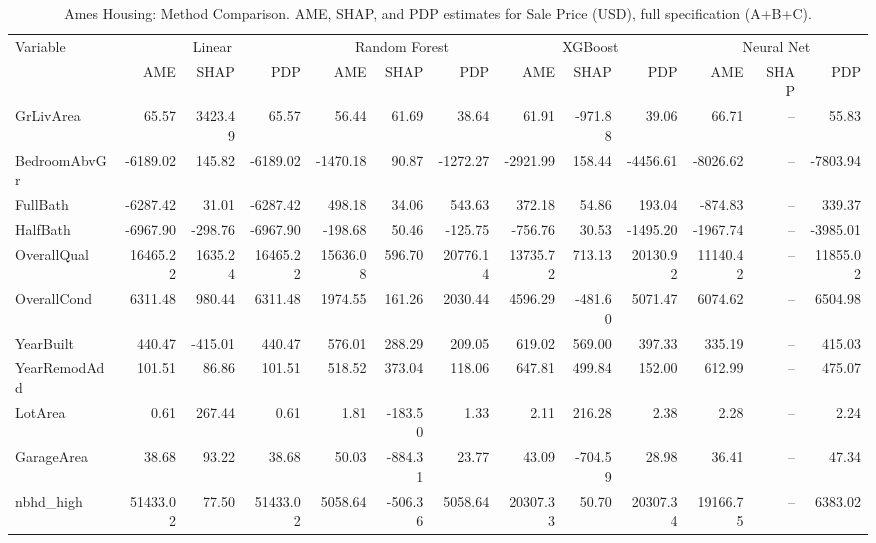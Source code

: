 \documentclass[12pt]{article}
\begin{document}
	\begin{table}
		\centering
		\small
		\begin{threeparttable}
			\caption{Ames Housing: Method Comparison. AME, SHAP, and PDP estimates for Sale Price (USD), full specification (A+B+C).}
			\label{tab:ames_housing_method_comparison}
			\begin{tabular}{lrrrrrrrrrrrr}
				\toprule
				Variable & \multicolumn{3}{c}{Linear} & \multicolumn{3}{c}{Random Forest} & \multicolumn{3}{c}{XGBoost} & \multicolumn{3}{c}{Neural Net} \\
				\cmidrule(lr){2-4} \cmidrule(lr){5-7} \cmidrule(lr){8-10} \cmidrule(lr){11-13} 
				& AME & SHAP & PDP & AME & SHAP & PDP & AME & SHAP & PDP & AME & SHAP & PDP \\
				\midrule
				GrLivArea & 65.57 & 3423.49 & 65.57 & 56.44 & 61.69 & 38.64 & 61.91 & -971.88 & 39.06 & 66.71 & -- & 55.83 \\
				BedroomAbvGr & -6189.02 & 145.82 & -6189.02 & -1470.18 & 90.87 & -1272.27 & -2921.99 & 158.44 & -4456.61 & -8026.62 & -- & -7803.94 \\
				FullBath & -6287.42 & 31.01 & -6287.42 & 498.18 & 34.06 & 543.63 & 372.18 & 54.86 & 193.04 & -874.83 & -- & 339.37 \\
				HalfBath & -6967.90 & -298.76 & -6967.90 & -198.68 & 50.46 & -125.75 & -756.76 & 30.53 & -1495.20 & -1967.74 & -- & -3985.01 \\
				\midrule
				OverallQual & 16465.22 & 1635.24 & 16465.22 & 15636.08 & 596.70 & 20776.14 & 13735.72 & 713.13 & 20130.92 & 11140.42 & -- & 11855.02 \\
				OverallCond & 6311.48 & 980.44 & 6311.48 & 1974.55 & 161.26 & 2030.44 & 4596.29 & -481.60 & 5071.47 & 6074.62 & -- & 6504.98 \\
				YearBuilt & 440.47 & -415.01 & 440.47 & 576.01 & 288.29 & 209.05 & 619.02 & 569.00 & 397.33 & 335.19 & -- & 415.03 \\
				YearRemodAdd & 101.51 & 86.86 & 101.51 & 518.52 & 373.04 & 118.06 & 647.81 & 499.84 & 152.00 & 612.99 & -- & 475.07 \\
				\midrule
				LotArea & 0.61 & 267.44 & 0.61 & 1.81 & -183.50 & 1.33 & 2.11 & 216.28 & 2.38 & 2.28 & -- & 2.24 \\
				GarageArea & 38.68 & 93.22 & 38.68 & 50.03 & -884.31 & 23.77 & 43.09 & -704.59 & 28.98 & 36.41 & -- & 47.34 \\
				nbhd\_high & 51433.02 & 77.50 & 51433.02 & 5058.64 & -506.36 & 5058.64 & 20307.33 & 50.70 & 20307.34 & 19166.75 & -- & 6383.02 \\

\end{tabular}
\end{threeparttable}
\end{table}
\end{document}
